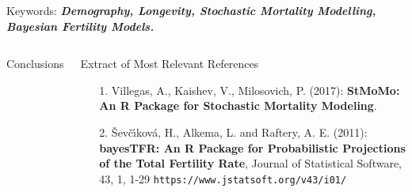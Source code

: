 \documentclass[]{beamer}
\begin{document}
\begin{frame}{\vspace{1ex}\hfill Keywords: \bfseries \textit{Demography, Longevity, Stochastic Mortality Modelling, Bayesian Fertility Models.}}
\begin{columns}[t]
\begin{minipage}{.999\columnwidth}
\begin{block}{Conclusions}
				\end{block}
			\end{minipage}
		\noindent
		
		\vspace{-0.5cm}
		
			\begin{block}{Extract of Most Relevant References}\vspace{-0.4cm}
				\begin{itemize}
				\item[1.] Villegas, A., Kaishev, V., Milosovich, P. (2017): \textbf{StMoMo: An R Package for Stochastic Mortality Modeling}.
				\item[2.] \v{S}ev\v{c}{\'\i}kov\'{a}, H., Alkema, L. and Raftery, A. E. (2011): \textbf{bayesTFR: An R Package for Probabilistic Projections of the Total Fertility Rate}, Journal of Statistical Software, 43, 1, 1-29 \texttt{https://www.jstatsoft.org/v43/i01/}
				\end{itemize}\vspace{-0.3cm}
				\end{block}
			
	\end{columns}
\end{frame}
\end{document}
